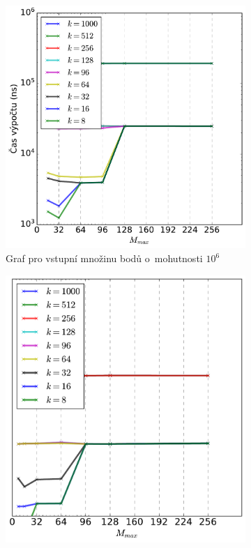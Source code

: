  \begin{figure}
 \begin{subfigure}[t]{0.5\columnwidth}
    \centering  
    \includegraphics[scale=0.4]{obrazky-figures/benchmark/knn_speed/benchmark_k_mmax_1m.pdf}
\caption{Graf pro vstupní množinu bodů o~mohutnosti $10^6$}
\hfill
\end{subfigure}
\begin{subfigure}[t]{0.5\columnwidth}
    \centering  
    \includegraphics[scale=0.4]{obrazky-figures/benchmark/knn_speed/benchmark_k_mmax_1k.pdf}


\end{subfigure}
\end{figure}
